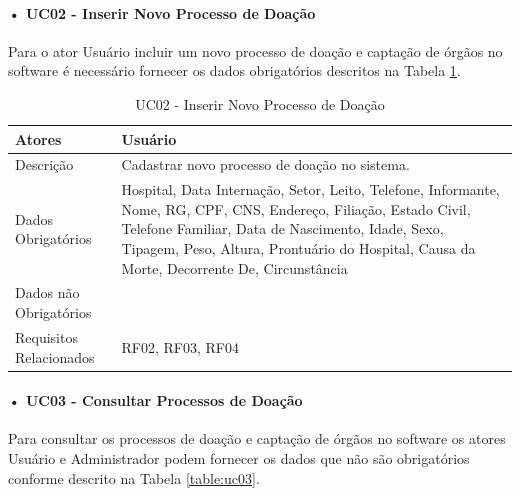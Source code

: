 \documentclass[portuguese,oneside]{tcc}
\begin{document}

\paragraph*{• UC02 - Inserir Novo Processo de Doação} \label{tab:uc-inserir}
Para o ator Usuário incluir um novo processo de doação e captação de órgãos no software é necessário fornecer os dados obrigatórios descritos na Tabela \ref{table:uc02}.

\begin{table}
	\centering
	\caption{UC02 - Inserir Novo Processo de Doação} \label{table:uc02}
		\begin{tabular}{ |p{5cm}|p{5cm}|  }
\hline
Atores & 
Usuário\\

\hline
Descrição & 
Cadastrar novo processo de doação no sistema. \\

\hline
Dados Obrigatórios & 
Hospital, Data Internação, Setor, Leito, Telefone, Informante, Nome, RG, CPF, CNS, Endereço, Filiação, Estado Civil, Telefone Familiar, Data de Nascimento, Idade, Sexo, Tipagem, Peso, Altura, Prontuário do Hospital, Causa da Morte, Decorrente De, Circunstância
 \\

\hline
Dados não Obrigatórios & 

 \\

\hline
Requisitos Relacionados & 
RF02, RF03, RF04
 \\
 
 \hline
		\end{tabular}
\end{table}



\paragraph*{• UC03 - Consultar Processos de Doação}
Para consultar os processos de doação e captação de órgãos no software os atores Usuário e Administrador podem fornecer os dados que não são obrigatórios conforme descrito na Tabela \ref{table:uc03}.
\end{document}
